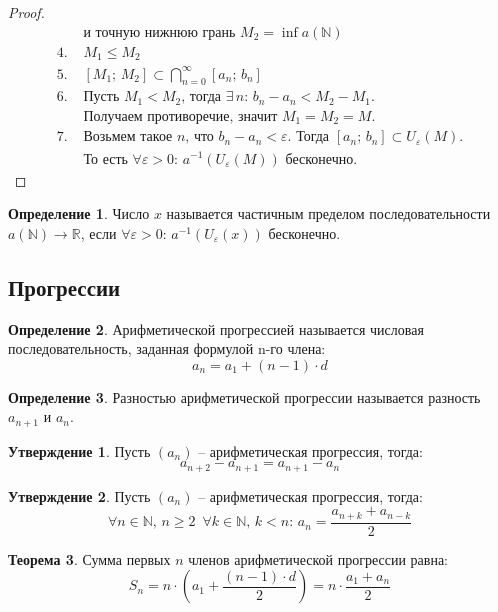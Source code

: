 \documentclass[12pt]{article}
\theoremstyle{definition}
\newtheorem{theorem}{Теорема}[section]
\newtheorem{definition}{Определение}
\newtheorem{statement}[theorem]{Утверждение}
\newcommand{\N}{\mathbb{N}}
\newcommand{\R}{\mathbb{R}}
\begin{document}
\begin{proof}
\begin{align*}
        &\text{и точную нижнюю грань } M_2 = \inf a(\N)\\
        4.\,\,&M_1\leq M_2\\
        5.\,\,&[M_1;\,M_2]\subset \bigcap_{n=0}^{\infty}[a_n;\,b_n]\\
        6.\,\,&\text{Пусть } M_1<M_2\text{, тогда } \exists\, n:\, b_n-a_n<M_2-M_1.\\
        &\text{Получаем противоречие, значит } M_1=M_2=M.\\
        7.\,\,&\text{Возьмем такое } n \text{, что } b_n-a_n<\varepsilon. \text{ Тогда } [a_n;\,b_n]\subset U_{\varepsilon}(M).\\
        &\text{То есть }\forall \varepsilon>0:\, a^{-1}(U_{\varepsilon}(M))\text{ бесконечно.}
    \end{align*}
\end{proof}
\begin{definition}
    Число $x$ называется частичным пределом последовательности $a(\N)\rightarrow \R$, если $\forall \varepsilon>0:\, a^{-1}(U_{\varepsilon}(x))$ бесконечно.
\end{definition}

\subsection{Прогрессии}

\begin{definition}
    Арифметической прогрессией называется числовая последовательность, заданная формулой n-го члена:
    $$a_n=a_1+(n-1)\cdot d$$
\end{definition}

\begin{definition}
    Разностью арифметической прогрессии называется разность $a_{n+1}$ и $a_n$.
\end{definition}

\begin{statement}
    Пусть $(a_n)$ -- арифметическая прогрессия, тогда:
    $$a_{n+2}-a_{n+1}=a_{n+1}-a_n$$
\end{statement}

\begin{statement}
    Пусть $(a_n)$ -- арифметическая прогрессия, тогда:
    $$\forall n \in \N,\,n\geq 2 \,\,\,\forall k \in \N,\, k<n:\, a_n=\frac{a_{n+k}+a_{n-k}}{2}$$
\end{statement}

\begin{theorem}
    Сумма первых $n$ членов арифметической прогрессии равна:
    $$S_n=n\cdot \left(a_1+\frac{(n-1)\cdot d}{2} \right)=n \cdot \frac{a_1 + a_n}{2}$$
\end{theorem}
\end{document}
